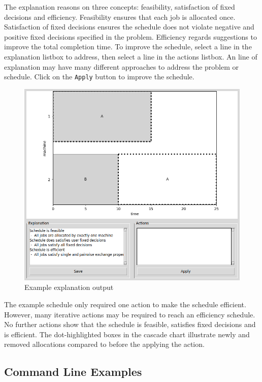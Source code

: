 The explanation reasons on three concepts: feasibility, satisfaction of fixed decisions and efficiency. Feasibility ensures that each job is allocated once. Satisfaction of fixed decisions ensures the schedule does not violate negative and positive fixed decisions specified in the problem. Efficiency regards suggestions to improve the total completion time. To improve the schedule, select a line in the explanation listbox to address, then select a line in the actions listbox. An line of explanation may have many different approaches to address the problem or schedule. Click on the \texttt{Apply} button to improve the schedule.

\begin{figure}[H]
	\centering
	\includegraphics[width=\linewidth]{figures/tool_improve.png}
	\caption{Example explanation output}
\end{figure}

The example schedule only required one action to make the schedule efficient. However, many iterative actions may be required to reach an efficiency schedule. No further actions show that the schedule is feasible, satisfies fixed decisions and is efficient. The dot-highlighted boxes in the cascade chart illustrate newly and removed allocations compared to before the applying the action.

\subsection{Command Line Examples}


